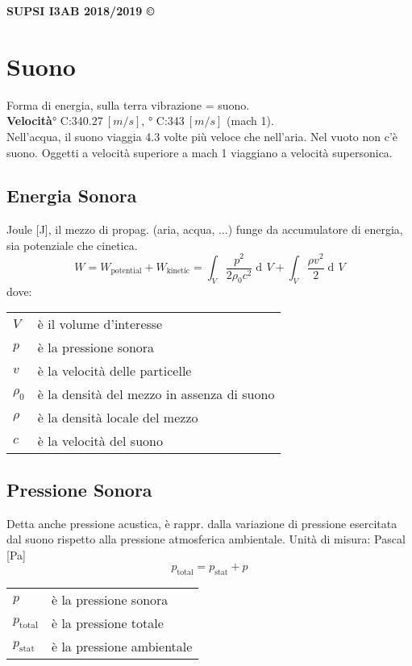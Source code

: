 \documentclass[8pt,a4paper]{article}
\DeclareMathOperator{\di}{d\!}
\begin{document}
\begin{multicols}{5}
  \noindent
  \textbf{SUPSI I3AB 2018/2019 ©} \\
    \section{Suono}
    Forma di energia, sulla terra vibrazione = suono. \\
    \textbf{Velocità}° C:\quad $340.27\ [m/s]$,
    ° C:\quad $343\ [m/s]$ (mach 1). \\
    Nell'acqua, il suono viaggia 4.3 volte più veloce che nell'aria.
    Nel vuoto non c'è suono. Oggetti a velocità superiore a mach 1 viaggiano a
    velocità supersonica. \\
    \subsection{Energia Sonora}
    Joule [J], il mezzo di propag. (aria, acqua, ...) funge da accumulatore
    di energia, sia potenziale che cinetica.
    \begin{equation*}
      W = W_{\text{potential}} + W_{\text{kinetic}} = \int_V \frac{p^2}{2\rho_0c^2} \di V
      + \int_V \frac{\rho v^2}{2} \di V
    \end{equation*}
    dove:\\
    \begin{tabular}{l l}
      $V$ & è il volume d'interesse\\
      $p$ & è la pressione sonora\\
      $v$ & è la velocità delle particelle\\
      $\rho_0$ & è la densità del mezzo in assenza di suono\\
      $\rho$ & è la densità locale del mezzo\\
      $c$ & è la velocità del suono
    \end{tabular}
    \subsection{Pressione Sonora}
    Detta anche pressione acustica, è rappr. dalla variazione di pressione esercitata
    dal suono rispetto alla pressione atmosferica ambientale.
    Unità di misura: Pascal [Pa]
    \begin{equation*}
      p_{\text{total}} = p_{\text{stat}} + p 
    \end{equation*}

    \begin{tabular}{ll}
      $p$ & è la pressione sonora \\
      $p_{\text{total}}$ & è la pressione totale \\
      $p_{\text{stat}}$ & è la pressione ambientale
    \end{tabular}


\end{multicols}
\end{document}

